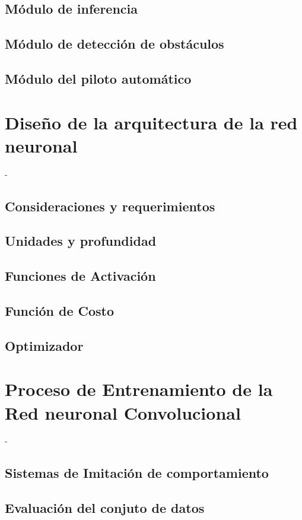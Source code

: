     \subsection{Módulo de inferencia}
    \subsection{Módulo de detección de obstáculos}
    \subsection{Módulo del piloto automático}

\section{Diseño de la arquitectura de la red neuronal}
-
    \subsection{Consideraciones y requerimientos}
    \subsection{Unidades y profundidad}
    \subsection{Funciones de Activación}
    \subsection{Función de Costo}
    \subsection{Optimizador}
    
\section{Proceso de Entrenamiento de la \\ Red neuronal Convolucional}
-
    \subsection{Sistemas de Imitación de comportamiento}
    \subsection{Evaluación del conjuto de datos}
